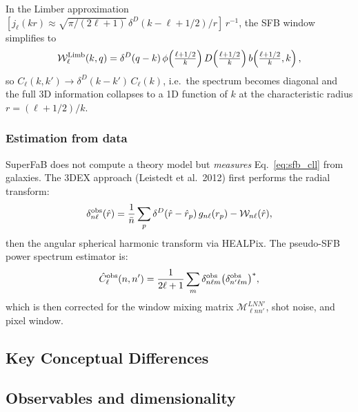 In the Limber approximation $[j_\ell(kr)\approx
\sqrt{\pi/(2\ell+1)}\,\delta^D(k-\ell+1/2)/r]\,r^{-1}$, the SFB
window simplifies to
\begin{equation}
    \mathcal{W}_\ell^{\rm Limb}(k,q) =
    \delta^D(q-k)\,\phi\!\left(\tfrac{\ell+1/2}{k}\right)
    D\!\left(\tfrac{\ell+1/2}{k}\right)
    b\!\left(\tfrac{\ell+1/2}{k},k\right),
\end{equation}
so $C_\ell(k,k')\to\delta^D(k-k')\,C_\ell(k)$, i.e.\ the spectrum
becomes diagonal and the full 3D information collapses to a 1D
function of $k$ at the characteristic radius $r=(\ell+1/2)/k$.

\subsubsection{Estimation from data}

SuperFaB does not compute a theory model but \emph{measures}
Eq.~\eqref{eq:sfb_cll} from galaxies. The 3DEX approach
(Leistedt et al.\ 2012) first performs the radial transform:
\begin{equation}
    \delta_{n\ell}^{\rm obs}(\hat{r}) =
    \frac{1}{\bar{n}}\sum_p
    \delta^D(\hat{r}-\hat{r}_p)\,g_{n\ell}(r_p)
    - \mathcal{W}_{n\ell}(\hat{r}),
\end{equation}
then the angular spherical harmonic transform via HEALPix.
The pseudo-SFB power spectrum estimator is:
\begin{equation}
    \hat{C}_\ell^{\rm obs}(n,n') =
    \frac{1}{2\ell+1}\sum_m
    \delta_{n\ell m}^{\rm obs}
    \bigl(\delta_{n'\ell m}^{\rm obs}\bigr)^*,
\end{equation}
which is then corrected for the window mixing matrix
$\mathcal{M}_{\ell nn'}^{LNN'}$, shot noise, and pixel window.

\subsection{Key Conceptual Differences}

\subsection{Observables and dimensionality}


